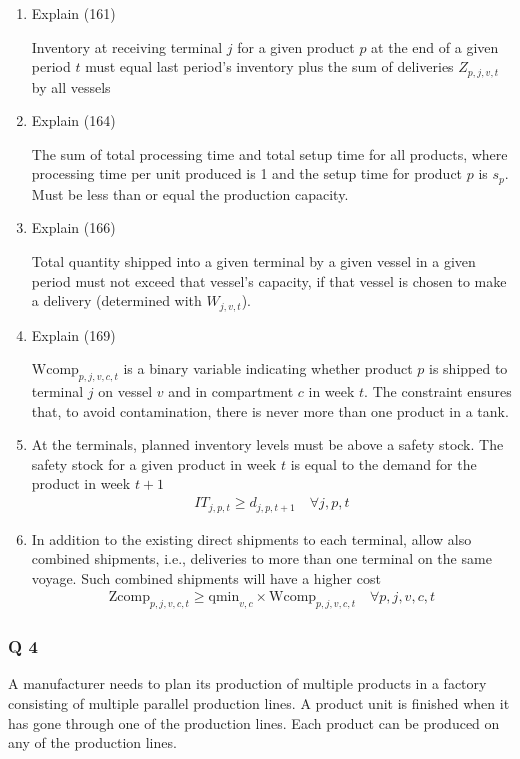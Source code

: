 \documentclass[10pt]{article}
\begin{document}
\begin{enumerate}
    \item Explain (161)

    Inventory at receiving terminal $j $ for a given product $p $ at the end of a given period $t $ must equal last period's inventory plus the sum of deliveries $Z_{p, j, v, t} $ by all vessels
    \item Explain (164)

    The sum of total processing time and total setup time for all products, where processing time per unit produced is 1 and the setup time for product $p $ is $s_p $. Must be less than or equal the production capacity.
    \item Explain (166)

    Total quantity shipped into a given terminal by a given vessel in a given period must not exceed that vessel's capacity, if that vessel is chosen to make a delivery (determined with $W_{j, v, t} $). 
    \item Explain (169)

    $\text{Wcomp}_{p, j, v, c, t} $ is a binary variable indicating whether product $p $ is shipped to terminal $j $ on vessel $v $ and in compartment $c $ in week $t $. The constraint ensures that, to avoid contamination, there is never more than one product in a tank.
    \item At the terminals, planned inventory levels must be above a safety stock. The safety stock for a given product in week $t $ is equal to the demand for the product in week $t + 1 $
    \begin{gather*}
        IT_{j, p, t} \ge d_{j, p, t + 1}\quad\forall j, p, t
    \end{gather*}
    \item In addition to the existing direct shipments to each terminal, allow also combined shipments, i.e., deliveries to more than one terminal on the same voyage. Such combined shipments will have a higher cost 
    \begin{gather*}
        \text{Zcomp}_{p, j, v, c, t} \ge \text{qmin}_{v, c}\times \text{Wcomp}_{p, j, v, c, t}\quad\forall p, j, v, c, t
    \end{gather*}
\end{enumerate}
\subsubsection{Q 4}
A manufacturer needs to plan its production of multiple products in a factory consisting of multiple parallel production lines. A product unit is finished when it has gone through one of the production lines. Each product can be produced on any of the production lines. 
\end{document}
